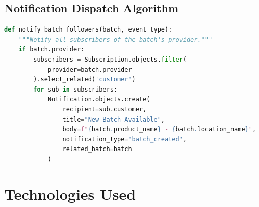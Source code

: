 \documentclass[12pt, a4paper]{report}
\begin{document}
\subsection{Notification Dispatch Algorithm}

\begin{lstlisting}[language=Python, caption={Notification dispatch for batch events}]
def notify_batch_followers(batch, event_type):
    """Notify all subscribers of the batch's provider."""
    if batch.provider:
        subscribers = Subscription.objects.filter(
            provider=batch.provider
        ).select_related('customer')
        for sub in subscribers:
            Notification.objects.create(
                recipient=sub.customer,
                title="New Batch Available",
                body=f"{batch.product_name} - {batch.location_name}",
                notification_type='batch_created',
                related_batch=batch
            )
\end{lstlisting}

\newpage
\section{Technologies Used}
\end{document}
